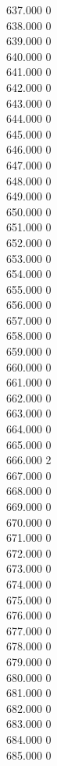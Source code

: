 { 637.000	0 \\
 638.000	0 \\
 639.000	0 \\
 640.000	0 \\
 641.000	0 \\
 642.000	0 \\
 643.000	0 \\
 644.000	0 \\
 645.000	0 \\
 646.000	0 \\
 647.000	0 \\
 648.000	0 \\
 649.000	0 \\
 650.000	0 \\
 651.000	0 \\
 652.000	0 \\
 653.000	0 \\
 654.000	0 \\
 655.000	0 \\
 656.000	0 \\
 657.000	0 \\
 658.000	0 \\
 659.000	0 \\
 660.000	0 \\
 661.000	0 \\
 662.000	0 \\
 663.000	0 \\
 664.000	0 \\
 665.000	0 \\
 666.000	2 \\
 667.000	0 \\
 668.000	0 \\
 669.000	0 \\
 670.000	0 \\
 671.000	0 \\
 672.000	0 \\
 673.000	0 \\
 674.000	0 \\
 675.000	0 \\
 676.000	0 \\
 677.000	0 \\
 678.000	0 \\
 679.000	0 \\
 680.000	0 \\
 681.000	0 \\
 682.000	0 \\
 683.000	0 \\
 684.000	0 \\
 685.000	0 \\
}
